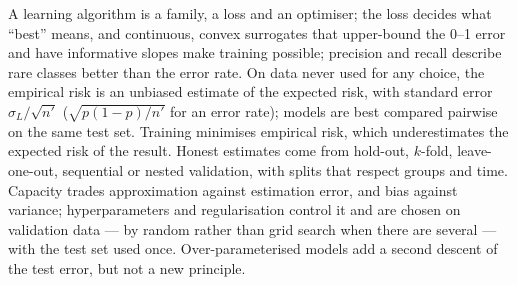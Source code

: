 \documentclass[11pt]{article}
\begin{document}
\begin{keyidea}[Summary]
A learning algorithm is a family, a loss and an optimiser; the loss decides what ``best'' means, and continuous,
convex surrogates that upper-bound the 0--1 error and have informative slopes make training possible; precision and
recall describe rare classes better than the error rate. On data never used for any choice, the empirical risk is an
unbiased estimate of the expected risk, with standard error $\sigma_L/\sqrt{n'}$ ($\sqrt{p(1-p)/n'}$ for an error rate);
models are best compared pairwise on the same test set. Training minimises empirical risk, which underestimates the
expected risk of the result. Honest estimates come from hold-out, $k$-fold, leave-one-out, sequential or nested
validation, with splits that respect groups and time. Capacity trades approximation against estimation error, and
bias against variance; hyperparameters and regularisation control it and are chosen on validation data --- by random
rather than grid search when there are several --- with the test set used once. Over-parameterised models add a
second descent of the test error, but not a new principle.
\end{keyidea}
\end{document}

